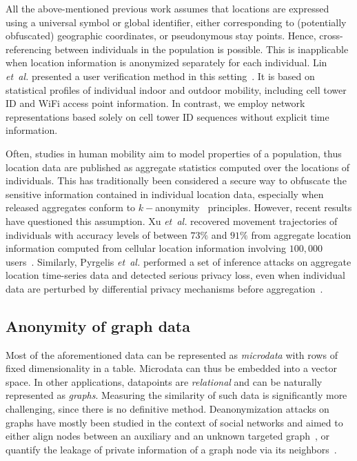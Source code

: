 All the above-mentioned previous work assumes that locations are expressed using a universal symbol or global identifier, either corresponding to (potentially obfuscated) geographic coordinates, or pseudonymous stay points.
Hence, cross-referencing between individuals in the population is possible.
This is inapplicable when location information is anonymized separately for each individual.
Lin \emph{et~al.} presented a user verification method in this setting~\cite{LinMobile}.
It is based on statistical profiles of individual indoor and outdoor mobility, including cell tower ID and WiFi access point information.
In contrast, we employ network representations based solely on cell tower ID sequences without explicit time information.

Often, studies in human mobility aim to model properties of a population, thus location data are published as aggregate statistics computed over the locations of individuals.
This has traditionally been considered a secure way to obfuscate the sensitive information contained in individual location data, especially when released aggregates conform to $ k-$anonymity~\cite{sweeney2002k} principles.
However, recent results have questioned this assumption.
Xu \emph{et~al.} recovered movement trajectories of individuals with accuracy levels of between $73\%$ and $91\%$ from aggregate location information computed from cellular location information involving $100,000$ users~\cite{xu2017trajectory}. Similarly, Pyrgelis \emph{et~al.} performed a set of inference attacks on aggregate location time-series data and detected serious privacy loss, even when individual data are perturbed by differential privacy mechanisms before aggregation~\cite{pyrgelis2017does}.

\subsection{Anonymity of graph data }
Most of the aforementioned data can be represented as \emph{microdata} with rows of fixed dimensionality in a table.
Microdata can thus be embedded into a vector space.
In other applications, datapoints are \emph{relational} and can be naturally represented as \emph{graphs}.
Measuring the similarity of such data is significantly more challenging, since there is no definitive method.
Deanonymization attacks on graphs have mostly been studied in the context of social networks and aimed to either align nodes between an auxiliary and an unknown targeted graph~\cite{narayanan2009anonymizing, sharad2014}, or quantify the leakage of private information of a graph node via its neighbors~\cite{zheleva09}.

